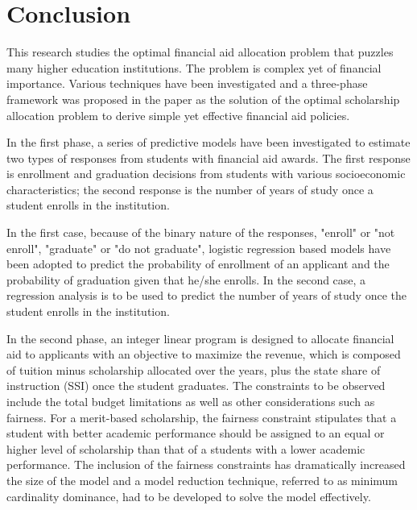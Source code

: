\documentclass[12pt,english]{report}
\begin{document}

\chapter{Conclusion}
This research studies the optimal financial aid allocation problem that puzzles many higher education institutions.  The problem is complex yet of financial importance. Various techniques have been investigated and a three-phase framework was proposed in the paper as the solution of the optimal scholarship allocation problem to derive simple yet effective financial aid policies.

In the first phase, a series of predictive models have been investigated to estimate two types of responses from students with financial aid awards. The first response is enrollment and graduation decisions from students with various socioeconomic characteristics;  the second response is the number of years of study once a student enrolls in the institution.

In the first case,  because of the binary nature of the responses,  "enroll" or "not enroll",  "graduate" or "do not graduate", logistic regression based models have been adopted to predict the probability of enrollment of an applicant and the probability of graduation given that he/she enrolls. In the second case, a regression analysis is to be used to predict the number of years of study once the student enrolls in the institution.

In the second phase, an integer linear program is designed to allocate financial aid to applicants with an objective to maximize the revenue, which is composed of tuition minus scholarship allocated over the years, plus the state share of instruction (SSI) once the student graduates.  The constraints to be observed include the total budget limitations as well as other considerations such as fairness. For a merit-based scholarship, the fairness constraint stipulates that a student with better academic performance should be assigned to an equal or higher level of scholarship than that of a students with a lower academic performance. The inclusion of the fairness constraints has dramatically increased the size of the model and a model reduction technique, referred to as minimum cardinality dominance, had to be developed to solve the model effectively.
\end{document}

